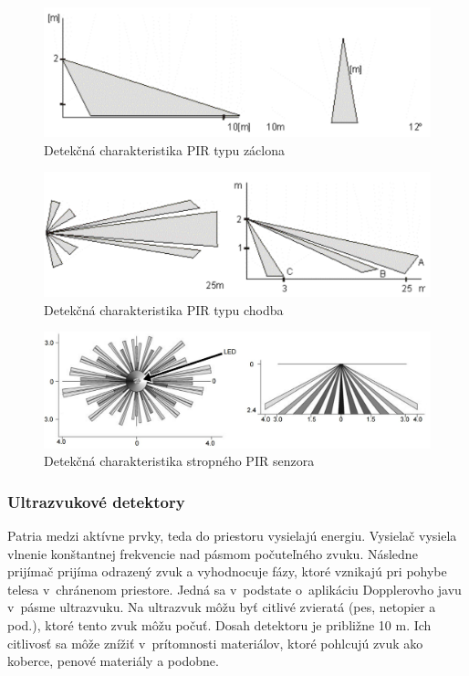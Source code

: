 \begin{figure}[!ht]
    \centering
    \includegraphics[width=0.75\linewidth]{obrazky-figures/PIR-zaclona.png}
    \caption[Detekčná charakteristika PIR typu záclona]{Detekčná charakteristika PIR typu záclona\cite{velas_ezs}}
    \label{fig:pir-zaclona}
\end{figure}

\begin{figure}[!ht]
    \centering
    \includegraphics[width=0.75\linewidth]{obrazky-figures/PIR-chodba.png}
    \caption[Detekčná charakteristika PIR typu chodba]{Detekčná charakteristika PIR typu chodba\cite{velas_ezs}}
    \label{fig:pir-chodba}
\end{figure}

\begin{figure}[!ht]
    \centering
    \includegraphics[width=0.75\linewidth]{obrazky-figures/PIR-strop.jpg}
    \caption[Detekčná charakteristika stropného PIR senzora]{Detekčná charakteristika stropného PIR senzora\cite{PIR-strop}}
    \label{fig:pir-strop}
\end{figure}

\subsubsection{Ultrazvukové detektory}

Patria medzi aktívne prvky, teda do priestoru vysielajú energiu. Vysielač vysiela vlnenie konštantnej frekvencie nad pásmom počuteľného zvuku. Následne prijímač prijíma odrazený zvuk a vyhodnocuje fázy, ktoré vznikajú pri pohybe telesa v~chránenom priestore. Jedná sa v~podstate o~aplikáciu Dopplerovho javu v~pásme ultrazvuku. Na ultrazvuk môžu byť citlivé zvieratá (pes, netopier a pod.), ktoré tento zvuk môžu počuť. Dosah detektoru je približne 10 m. Ich citlivosť sa môže znížiť v~prítomnosti materiálov, ktoré pohlcujú zvuk ako koberce, penové materiály a podobne.\cite{Krecek}


